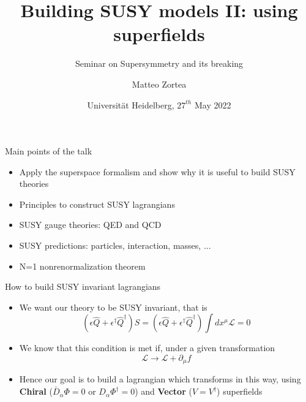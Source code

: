 \documentclass[10pt]{beamer}
\title{Building SUSY models II: using superfields}
\subtitle{Seminar on Supersymmetry and its breaking}
\author{Matteo Zortea}
\date{Universit\"at Heidelberg, $27^{th}$ May 2022}
\institute{Coordinated by prof. J\"org J\"ackel}
\begin{document}
\begin{frame}
\titlepage
\end{frame}

\begin{frame}{Main points of the talk}
\begin{itemize}
    \item Apply the superspace formalism and show why it is useful to build SUSY theories
    \item Principles to construct SUSY lagrangians 
    \item SUSY gauge theories: QED and QCD
    \item SUSY predictions: particles, interaction, masses, ...
    \item N=1 nonrenormalization theorem
\end{itemize}
\end{frame}

\begin{frame}{How to build SUSY invariant lagrangians}
    \begin{itemize}
        \item We want our theory to be SUSY invariant, that is
            \begin{equation*}
                \left(\epsilon \hat Q + \epsilon^\dagger \hat Q^{\dagger}\right) S = \left(\epsilon \hat Q + \epsilon^\dagger \hat Q^{\dagger}\right) \int dx^\mu \mathcal{L} = 0
            \end{equation*}
        \item We know that this condition is met if, under a given transformation
            \begin{equation*}
                \mathcal{L} \to \mathcal{L} + \partial_\mu f
            \end{equation*}
        \item Hence our goal is to build a lagrangian which transforms in this way, using \textbf{Chiral} ($\bar D_{\dot\alpha} \Phi = 0$ or $D_{\alpha}\Phi^{\dagger} = 0$) and \textbf{Vector} ($V=V^{\dagger}$) superfields
    \end{itemize}
\end{frame}
\end{document}
